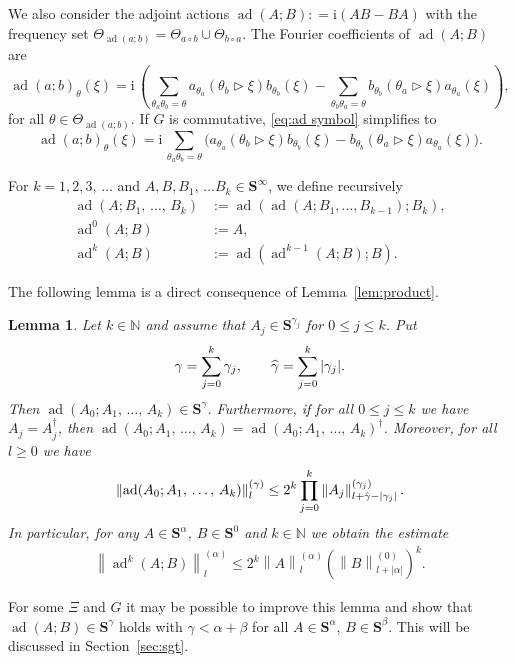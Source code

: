 \documentclass[10pt]{amsart}
\newtheorem{lemm}[theo]{Lemma}\newtheorem{prop}[theo]{Proposition}\newtheorem{coro}[theo]{Corollary}\newtheorem{conj}[theo]{Conjecture}
\theoremstyle{definition}\newtheorem{defi}[theo]{Definition}\newtheorem{rema}[theo]{Remark}\newtheorem{exam}[theo]{Example}\newtheorem{nota}[theo]{Notation}
\DeclareMathOperator{\ad}{ad}
\newcommand{\rmi}{\mathrm{i}}
\newcommand{\N}{\mathbb N}
\newcommand{\BS}{\mathbf S}
\newcommand{\act}{\triangleright}
\newcommand{\abs}[1]{\left\lvert #1 \right\rvert}
\newcommand{\snorm}[3]{\left\| #1\right\|_{#3}^{(#2)}}
\let\oldhat\hat
\renewcommand*{\hat}[1]{\mathchoice{\widehat{#1}}{\widehat{#1}}{\oldhat{#1}}{\oldhat{#1}}}
\begin{document}
We also consider the adjoint actions $\ad(A;B): = \rmi(AB -BA)$ with the frequency set $\Theta_{\ad(a;b)} = \Theta_{a \circ b } \cup \Theta_{b \circ a}$. The Fourier coefficients of $\ad(A;B)$ are
\begin{equation}\label{eq:ad symbol}
\ad(a;b)_\theta(\xi) = \rmi\, \left(\sum_{\theta_a \theta_b = \theta} a_{\theta_a}(\theta_b\act\xi) b_{\theta_b}(\xi) -
\sum_{\theta_b \theta_a = \theta} b_{\theta_b}(\theta_a\act\xi)a_{\theta_a}(\xi)\right),
\end{equation}
for all $\theta \in \Theta_{\ad(a;b)}$. If $G$ is commutative, \eqref{eq:ad symbol} simplifies to
\begin{equation}\label{eq:adcom}
\ad(a;b)_\theta(\xi) = \rmi\, \sum_{\theta_a \theta_b = \theta}\big(a_{\theta_a}(\theta_b\act\xi) b_{\theta_b}(\xi) - b_{\theta_b}(\theta_a\act\xi)a_{\theta_a}(\xi)\big).
\end{equation}

For $k=1,2,3,\,\dots$ and $A,B,B_1,\,\dots B_k\in\BS^\infty$, we define recursively \label{page:defad}
\begin{equation}\label{eq:defadk}
\begin{aligned}
\ad(A;B_1,\,\dotsc,\,B_k) &:= \ad\left(\ad(A;B_1,\dotsc,B_{k-1});B_k\right),\\
\ad^0(A;B)&:= A,\\
\ad^k(A;B)&:= \ad\left(\ad^{k -1}(A;B);B\right).
\end{aligned}
\end{equation}

The following lemma is a direct consequence of Lemma~\ref{lem:product}.
\begin{lemm}\label{lem:weakcommest}
Let $k \in \N$ and assume that $A_j \in \BS^{\gamma_j}$ for $0 \le j \le k$. Put
\begin{equation}
\gamma = \sum_{j=0}^k \gamma_j, \qquad \hat\gamma =\sum_{j=0}^k |\gamma_j|.
\end{equation}
Then $\ad(A_0;A_1,\,\dotsc,\,A_k) \in \BS^{\gamma}$. Furthermore, if for all $0 \le j\le k$ we have $A_j = A_j^\dagger$, then $\ad(A_0;A_1,\,\dotsc,\,A_k)=\ad(A_0;A_1,\,\dotsc,\,A_k)^\dagger$. Moreover, for all $l
\ge 0$ we have
\begin{equation}
\begin{aligned}\label{eq:normestcomm}
\snorm{\ad(A_0;A_1,\,\dotsc,\,A_k)}{\gamma}{l}\leq 2^{k}
\prod_{j=0}^k \snorm{A_j}{\gamma_{j}}{l + \hat\gamma - |\gamma_j|}.
\end{aligned}
\end{equation}
In particular, for any $A\in\BS^{\alpha}$, $B\in\BS^{0}$ and $k\in\N$ we obtain the estimate
\begin{align}\label{eq:normestcommzeroorder}
\snorm{\ad^k(A;B)}{\alpha}{l}\leq 2^k \snorm{A}{\alpha}{l}
\left(\snorm{B}{0}{l + \abs{\alpha}}\right)^k.
\end{align}
\end{lemm}
For some $\Xi$ and $G$ it may be possible to improve this lemma and show that $\ad(A;B)\in\BS^\gamma$ holds with $\gamma<\alpha+\beta$ for all $A\in\BS^{\alpha}$, $B\in\BS^{\beta}$. This will be discussed in Section~\ref{sec:sgt}.
\end{document}
